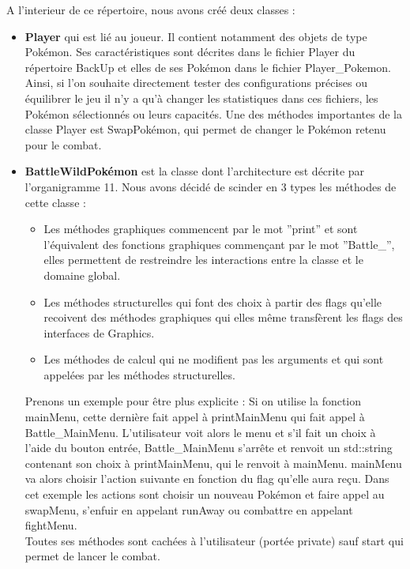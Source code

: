 A l'interieur de ce répertoire, nous avons créé deux classes :
\begin{itemize}
\item \textbf{Player} qui est lié au joueur. Il contient notamment des objets de type Pokémon. Ses caractéristiques sont décrites dans le fichier Player du répertoire BackUp et elles de ses Pokémon dans le fichier Player\_Pokemon. Ainsi, si l'on souhaite directement tester des configurations précises ou équilibrer le jeu il n'y a qu'à changer les statistiques dans ces fichiers, les Pokémon sélectionnés ou leurs capacités. Une des méthodes importantes de la classe Player est SwapPokémon, qui permet de changer le Pokémon retenu pour le combat.

\item \textbf{BattleWildPokémon} est la classe dont l'architecture est décrite par l'organigramme 11. Nous avons décidé de scinder en 3 types les méthodes de cette classe :
\begin{itemize}
\item Les méthodes graphiques commencent par le mot ''print'' et sont l'équivalent des fonctions graphiques commençant par le mot ''Battle\_'', elles permettent de restreindre les interactions entre la classe et le domaine global.
\item Les méthodes structurelles qui font des choix à partir des flags qu'elle recoivent des méthodes graphiques qui elles même transfèrent les flags des interfaces de Graphics. 
\item Les méthodes de calcul qui ne modifient pas les arguments et qui sont appelées par les méthodes structurelles.
\end{itemize}
Prenons un exemple pour être plus explicite : Si on utilise la fonction mainMenu, cette dernière fait appel à printMainMenu qui fait appel à Battle\_MainMenu. L'utilisateur voit alors le menu et s'il fait un choix à l'aide du bouton entrée, Battle\_MainMenu s'arrête et renvoit un std::string contenant son choix à printMainMenu, qui le renvoit à mainMenu. mainMenu va alors choisir l'action suivante en fonction du flag qu'elle aura reçu. Dans cet exemple les actions sont choisir un nouveau Pokémon et faire appel au swapMenu, s'enfuir en appelant runAway ou combattre en appelant fightMenu.\\

Toutes ses méthodes sont cachées à l'utilisateur (portée private) sauf start qui permet de lancer le combat. 
\end{itemize}
